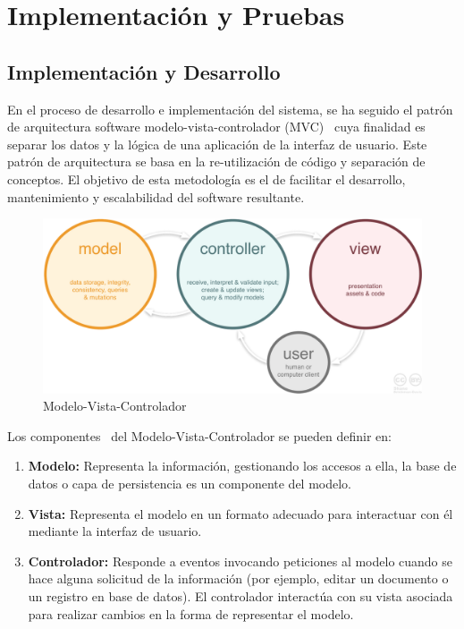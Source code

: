 \documentclass[a4paper,11pt]{book}
\begin{document}
\chapter{ Implementación y Pruebas}


\section{Implementación y Desarrollo}\label{secid}

En el proceso de desarrollo e implementación del sistema, se ha seguido el patrón de arquitectura software modelo-vista-controlador (MVC)~\cite{mvc} cuya finalidad es separar los datos y la lógica de una aplicación de la interfaz de usuario. Este patrón de arquitectura se basa en la re-utilización de código y separación de conceptos. El objetivo de esta metodología es el de facilitar el desarrollo, mantenimiento y escalabilidad del software resultante.

\begin{figure}[H]
\centering
\includegraphics[scale=0.20]{imagenes/mvc.png}
\caption{ Modelo-Vista-Controlador~\cite{mvc2}  }
\end{figure}

Los componentes~\cite{mvc3} del Modelo-Vista-Controlador se pueden definir en:

\begin{enumerate}
\item \textbf{Modelo:} Representa la información, gestionando los accesos a ella, la base de datos  o capa de persistencia es un componente del modelo.

\item \textbf{Vista:} Representa el modelo en un formato adecuado para interactuar con él mediante la interfaz de usuario.

\item \textbf{Controlador:} Responde a eventos invocando peticiones al modelo cuando se hace alguna solicitud de la información (por ejemplo, editar un documento o un registro en base de datos). El controlador interactúa con su vista asociada para realizar cambios en la forma de representar el modelo.
\end{enumerate}
\end{document}
